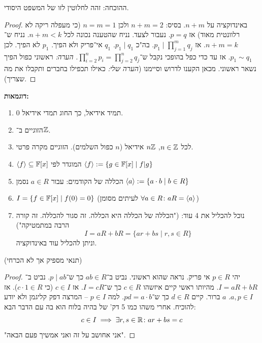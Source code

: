 \documentclass[]{../../../../tex/classes/styledArticle}
\begin{document}
	ההוכחה: זהה לחלוטין לזו של המשפט היסודי. \begin{proof}
		באינדוקציה על $n+m$. בסיס: $n + m = 2$ ולכן $n = m = 1$ (כי מעפלה ריקה לא רלוונטית מאוד) אז $p = q$. נעבור לצעד. נניח שהטענה נכונה לכל $n + m < k$. נניח ש־$n + m = k$. אז $p_1 \mid \prod_{j = 1}^{m}q_j$. בה"כ $p_1 \mid q_1$. $q_1$ אי־פריק ולא הפיך. $p_1$ לא הפיך. לכן $p_1 \sim q_1$. אז עד כדי כפל בהופכי נקבל ש־$\prod_{i = 2}^{n} p_i = \prod_{j = 2}^{n} q_j$. \textit{הערה: }ראשוני כפול הפיך נשאר ראשוני. מכאן הקענו לדרוש וסיימנו (\textit{הערה שלי: }כאילו תכפילו בחברים ותקבלו את מה שצריך). 
	\end{proof}
	
	\textbf{דוגמאות: }\begin{enumerate}
		\item $0$ תמיד אידיאל, כך החוג תמדי אידיאל. 
		\item הזוגיים ב־$\mathbb{Z}$. 
		\item לכל $n \in \mathbb{Z}$, $n\mathbb{Z}$ אידיאל ($n$ כפול השלמים). הזוגיים מקרה פרטי. 
		\item $\langle f \rangle \subseteq \mathbb{F}[x]$ המוגדר לפי $\langle f \rangle := \{g \in \mathbb{F}[x] \mid f|g\}$
		\item הכללה של הקודמים: עבור $a \in R$ נסמן $\langle a \rangle := \{a \cdot b \mid b \in R\}$
		\item $I = \{f \in \mathbb{F}[x] \mid f(0) = 0\}$ (לעיתים מסומן $\forall a \in R \colon aR = \langle a \rangle$)
		\item נוכל להכליל את 4 עוד: ("הכללה של הכללה היא הכללה. זה סגור להכללה. זה קורה הרבה במתמטיקה")
		\[ I = aR + bR = \{ar + bs \mid r, s \in R\} \]
		וניתן להכליל עוד באינדוקציה. 
	\end{enumerate}
	(תנאי מספיק אך לא הכרחי)
	
	\begin{proof}
		יהי $p \in R$ אי פריק. נראה שהוא ראשוני. נביט ב־$ab \in R$ כך ש־$p \mid ab$. נביט ב־$I = aR + bR$. מהיותו ראשי קיים איזשהו $c \in R$ כך ש־$I = cR$. אז $c \in I$ (כי $c \cdot 1 \in R$). אז $a, p \in I$. $a$ ברור. קיים $d \in R$ כך ש־$pd = a \cdot b$. למה $p \in I$ – המרצה דפק קליגמן ולא יודע להוכיח. 
		אחרי משהו כמו 5 דק' של בהיה בלוח הוא בה עם הדבר הבא: 
		\[ c \in I \implies \exists r, s \in \mathbb{R}\colon ar + bs = c \]
		"אני אחושב על זה ואני אמשיך פעם הבאה". 
	\end{proof}
	
	
	
	\ndoc
\end{document}

